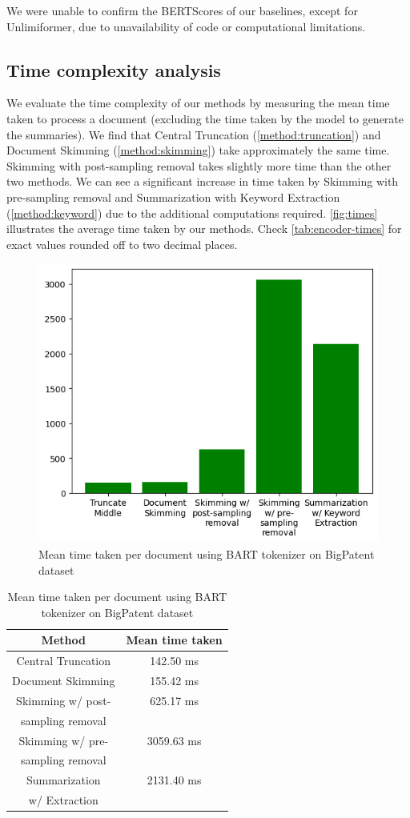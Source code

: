 	We were unable to confirm the BERTScores of our baselines, except for Unlimiformer, due to
	unavailability of code or computational limitations.


	\subsection*{Time complexity analysis}

		We evaluate the time complexity of our methods by measuring the mean time taken to process a
		document (excluding the time taken by the model to generate the summaries).
		We find that Central Truncation (\ref{method:truncation}) and Document Skimming
		(\ref{method:skimming}) take approximately the same time.
		Skimming with post-sampling removal takes slightly more time than the other two methods.
		We can see a significant increase in time taken by Skimming with pre-sampling removal
		and Summarization with Keyword Extraction (\ref{method:keyword}) due to the additional
		computations required.
		\autoref{fig:times} illustrates the average time taken by our methods.
		Check \autoref{tab:encoder-times} for exact values rounded off to two decimal places.

		\begin{figure}[!ht]
			\centering
			\includegraphics[width=.48\textwidth]{Images/encoder-times.png}
			\caption{Mean time taken per document using BART tokenizer on BigPatent dataset}
			\label{fig:times}
		\end{figure}

		\begin{table}[!ht]
			\centering

			\begin{tabular}{c c}
				\hline
				Method & Mean time taken \\
				\hline
				Central Truncation & 142.50 ms \\
				Document Skimming & 155.42 ms \\
				Skimming w/ post- & 625.17 ms \\
				sampling removal & \\
				Skimming w/ pre- & 3059.63 ms \\
				sampling removal & \\
				Summarization & 2131.40 ms \\
				w/ Extraction & \\
				\hline
			\end{tabular}

			\caption{Mean time taken per document using BART tokenizer on BigPatent dataset}
			\label{tab:encoder-times}
		\end{table}
